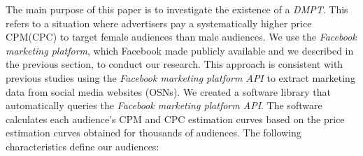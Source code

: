 \documentclass[twocolumn]{bmcart}\usepackage{lineno}
\begin{document}
The main purpose of this paper is to investigate the existence of a \emph{DMPT}. This refers to a situation where advertisers pay a systematically higher price CPM(CPC) to target female audiences than male audiences. We use the \emph{Facebook marketing platform}, which Facebook made publicly available and we described in the previous section, to conduct our research. This approach is consistent with previous studies using the \emph{Facebook marketing platform API} to extract marketing data from social media websites (OSNs)\cite{gonzalez2017fdvt,korolova2010privacy,chen2013much,liu2014measurement,saez2014beyond,marciel2016value,saha2017characterizing, mehrjoo2022new}. We created a software library that automatically queries the \emph{Facebook marketing platform API}. The software calculates each audience's CPM and CPC estimation curves based on the price estimation curves obtained for thousands of audiences. The following characteristics define our audiences:
\end{document}
